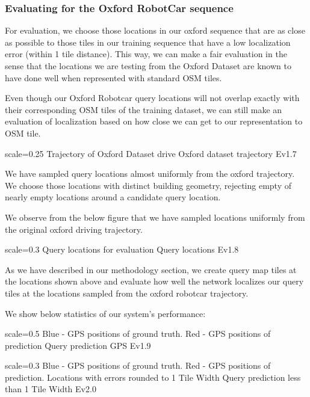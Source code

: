 \subsubsection{Evaluating for the Oxford RobotCar sequence}
For evaluation, we choose those locations in our oxford sequence that are as close as possible to those tiles in our training sequence that have a low localization error (within 1 tile distance). This way, we can make a fair evaluation in the sense that the locations we are testing from the Oxford Dataset are known to have done well when represented with standard OSM tiles.

Even though our Oxford Robotcar query locations will not overlap exactly with their corresponding OSM tiles of the training dataset, we can still make an evaluation of localization based on how close we can get to our representation to OSM tile.

{scale=0.25}%
{Trajectory of Oxford Dataset drive}%
{Oxford dataset trajectory}%
{Ev1.7}

We have sampled query locations almost uniformly from the oxford trajectory. We choose those locations with distinct building geometry, rejecting empty of nearly empty locations around a candidate query location.

\pagebreak
We observe from the below figure that we have sampled locations uniformly from the original oxford driving trajectory. 

{scale=0.3}%
{Query locations for evaluation}%
{Query locations}%
{Ev1.8}

As we have described in our methodology section, we create query map tiles at the locations shown above and evaluate how well the network localizes our query tiles at the locations sampled from the oxford robotcar trajectory. 

We show below statistics of our system's performance:

{scale=0.5}%
{Blue - GPS positions of ground truth. Red - GPS positions of prediction}%
{Query prediction GPS}%
{Ev1.9}

{scale=0.3}%
{Blue - GPS positions of ground truth. Red - GPS positions of prediction. Locations with errors rounded to 1 Tile Width}%
{Query prediction less than 1 Tile Width}%
{Ev2.0}

